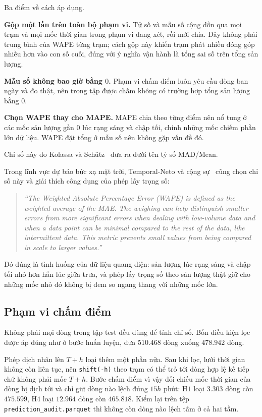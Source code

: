 \documentclass[12pt, a4paper]{report}
\begin{document}
Ba điểm về cách áp dụng.

\textbf{Gộp một lần trên toàn bộ phạm vi.} Tử số và mẫu số cộng dồn qua mọi trạm và mọi mốc
thời gian trong phạm vi đang xét, rồi mới chia. Đây không phải trung bình của WAPE từng trạm;
cách gộp này khiến trạm phát nhiều đóng góp nhiều hơn vào con số cuối, đúng với ý nghĩa vận
hành là tổng sai số trên tổng sản lượng.

\textbf{Mẫu số không bao giờ bằng $0$.} Phạm vi chấm điểm luôn yêu cầu dòng ban ngày và đo
thật, nên trong tập được chấm không có trường hợp tổng sản lượng bằng $0$.

\textbf{Chọn WAPE thay cho MAPE.} MAPE chia theo từng điểm nên nổ tung ở các mốc sản
lượng gần $0$ lúc rạng sáng và chập tối, chính những mốc chiếm phần lớn dữ liệu. WAPE đặt
tổng ở mẫu số nên không gặp vấn đề đó.

Chỉ số này do Kolassa và Schütz~\cite{kolassa2007mad} đưa ra dưới tên tỷ số MAD/Mean.

Trong lĩnh vực dự báo bức xạ mặt trời, Temporal-Neto và cộng sự~\cite{pin2025wape} cũng chọn
chỉ số này và giải thích công dụng của phép lấy trọng số:

\begin{quote}\small
\textit{``The Weighted Absolute Percentage Error (WAPE) is defined as the weighted average of
the MAE. The weighing can help distinguish smaller errors from more significant errors when
dealing with low-volume data and when a data point can be minimal compared to the rest of the
data, like intermittent data. This metric prevents small values from being compared in scale to
larger values.''}
\end{quote}

Đó đúng là tình huống của dữ liệu quang điện: sản lượng lúc rạng sáng và chập tối nhỏ hơn hẳn
lúc giữa trưa, và phép lấy trọng số theo sản lượng thật giữ cho những mốc nhỏ đó không bị đem so
ngang thang với những mốc lớn.


\FloatBarrier
\subsection{Phạm vi chấm điểm}

Không phải mọi dòng trong tập test đều dùng để tính chỉ số. Bốn điều kiện lọc được áp đúng như
ở bước huấn luyện, đưa $510.468$ dòng xuống $478.942$ dòng.

Phép dịch nhãn lên $T{+}h$ loại thêm một phần nữa. Sau khi lọc, lưới thời gian không còn liên
tục, nên \texttt{shift(-h)} theo trạm có thể trỏ tới dòng hợp lệ kế tiếp chứ không phải mốc
$T{+}h$. Bước chấm điểm vì vậy đối chiếu mốc thời gian của dòng bị dịch tới và chỉ giữ dòng
nào lệch đúng $15h$ phút: H$1$ loại $3.303$ dòng còn $\mathbf{475.599}$, H$4$ loại $12.964$
dòng còn $\mathbf{465.818}$. Kiểm lại trên tệp \texttt{prediction\_audit.parquet} thì không còn
dòng nào lệch tầm ở cả hai tầm.
\end{document}
